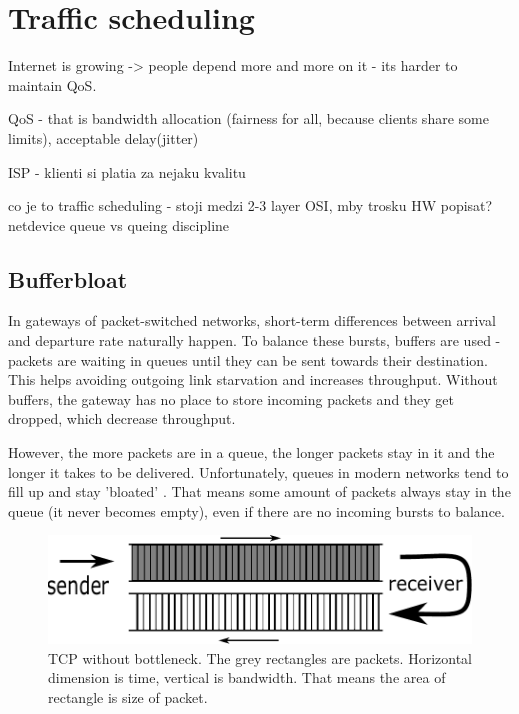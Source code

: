 \chapter{Traffic scheduling}
\label{chap:gf}

Internet is growing -> people depend more and more on it - its harder to maintain QoS.

 QoS - that is bandwidth allocation (fairness for all, because clients share some limits), acceptable delay(jitter)
 
ISP - klienti si platia za nejaku kvalitu

co je to traffic scheduling - stoji medzi 2-3 layer OSI, mby trosku HW popisat? netdevice queue vs queing discipline 

\section{Bufferbloat}


In gateways of packet-switched networks, short-term differences between arrival and departure rate naturally happen. To balance these bursts, buffers are used - packets are waiting in queues until they can be sent towards their destination. This helps avoiding outgoing link starvation and increases throughput. Without buffers, the gateway has no place to store incoming packets and they get dropped, which decrease throughput.


However, the more packets are in a queue, the longer packets stay in it and the longer it takes to be delivered. Unfortunately, queues in modern networks tend to fill up and stay 'bloated' \cite{Gettys:2012:BDB:2063176.2063196}. That means some amount of packets always stay in the queue (it never becomes empty), even if there are no incoming bursts to balance.

\begin{figure}
	\centering

\includegraphics[width=137mm]{drawings/tcp_no_bottleneck}
\caption{TCP without bottleneck. The grey rectangles are packets. Horizontal dimension is time, vertical is bandwidth. That means the area of rectangle is size of packet.}

\label{fig01:no_bottle}
\end{figure}

